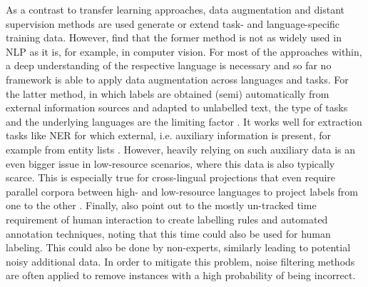 \documentclass[11pt,a4paper,twoside,openright]{scrbook}
\begin{document}
As a contrast to transfer learning approaches, data augmentation and distant supervision methods are used generate or extend task- and language-specific training data. However, \citet{hedderich-etal-2021-survey} find that the former method is not as widely used in NLP as it is, for example, in computer vision. For most of the approaches within, a deep understanding of the respective language is necessary and so far no framework is able to apply data augmentation across languages and tasks. For the latter method, in which labels are obtained (semi) automatically from external information sources and adapted to unlabelled text, the type of tasks and the underlying languages are the limiting factor \citep{hedderich-etal-2021-survey}. It works well for extraction tasks like NER for which external, i.e. auxiliary information is present, for example from entity lists \citep{hedderich-etal-2020-transfer}. However, heavily relying on such auxiliary data is an even bigger issue in low-resource scenarios, where this data is also typically scarce. This is especially true for cross-lingual projections that even require parallel corpora between high- and low-resource languages to project labels from one to the other \citep{Zampieri_Nakov_Scherrer_2020}. Finally, \citep{hedderich-etal-2021-survey} also point out to the mostly un-tracked time requirement of human interaction to create labelling rules and automated annotation techniques, noting that this time could also be used for human labeling. This could also be done by non-experts, similarly leading to potential noisy additional data. In order to mitigate this problem, noise filtering methods are often applied to remove instances with a high probability of being incorrect.
\end{document}
